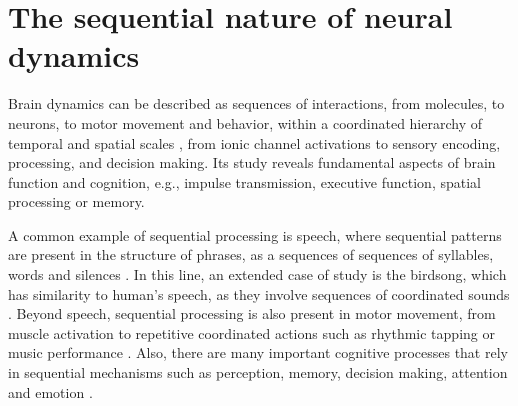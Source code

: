 \section{The sequential nature of neural dynamics}
Brain dynamics can be described as sequences of interactions, from molecules, to neurons, to motor movement and behavior, within a coordinated hierarchy of temporal and spatial scales \parencite{kiebel_hierarchy_2008,yuste05,rabinovich_discrete_2018,Rabinovich23},  from ionic channel activations to sensory encoding, processing, and decision making. Its study reveals fundamental aspects of brain function and cognition, e.g., impulse transmission, executive function, spatial processing or memory.









 A common example of sequential processing is speech, where sequential patterns are present in the structure of phrases, as a sequences of sequences of syllables, words and silences \parencite{kiebel_recognizing_2009}. In this line, an extended case of study is the birdsong, which has  similarity to human's speech, as they involve sequences of coordinated sounds \parencite{prather_brains_2017,fishbein_sound_2019}. Beyond speech, sequential processing is also present in motor movement, from muscle activation to repetitive coordinated actions such as rhythmic tapping or music performance \parencite{ding_temporal_2017}. Also, there are many important cognitive processes that rely in sequential mechanisms such as perception, memory, decision making, attention and emotion \parencite{Varona2016, he_robust_2018, rabinovich_sequential_2020}.

